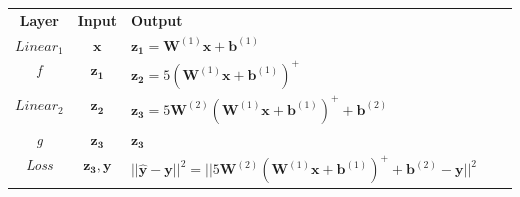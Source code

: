 \documentclass{article}
\begin{document}
\begin{enumerate}[(a)]
\begin{tcolorbox}
    \centering
            \begin{tabular}{|c|c|l|cc}
                \cline{1-3}
                \textbf{Layer}                                  & \textbf{Input} & \textbf{Output} &  & \\
                \cline{1-3}
                \textit{$Linear_1$}                             & $\bm{x}$       &
                $\bm{z_1}=\bm{W}^{(1)}\bm{x}+\bm{b}^{(1)}$      &                &                      \\ \cline{1-3}
                \textit{f}                                      & $\bm{z_1}$     &
                $\bm{z_2}=5(\bm{W}^{(1)}\bm{x}+\bm{b}^{(1)})^+$ &                &                      \\
                \cline{1-3}
                \textit{$Linear_2$}                             & $\bm{z_2}$     &
                $\bm{z_3}=5\bm{W}^{(2)}(\bm{W}^{(1)}\bm{x}+\bm{b}^{(1)})^++\bm{b}^{(2)}$
                                                                &                &                      \\ \cline{1-3}
                \textit{g}                                      & $\bm{z_3}$     & $\bm{z_3}$
                                                                &                &                      \\ \cline{1-3}
                \textit{Loss}                                   & $\bm{z_3, y}$  &
                $||\bm{\hat{y}-y}||^2=||5\bm{W}^{(2)}(\bm{W}^{(1)}\bm{x}+\bm{b}^{(1)})^++\bm{b}^{(2)}-\bm{y}||^2$
                                                                &                &                      \\ \cline{1-3}
            \end{tabular}
\end{tcolorbox}



\end{enumerate}
\end{document}
